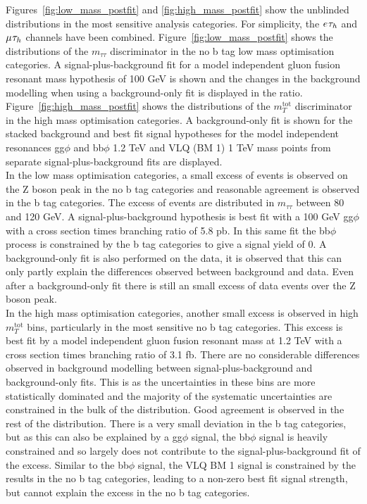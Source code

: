 Figures~\ref{fig:low_mass_postfit} and \ref{fig:high_mass_postfit} show the unblinded distributions in the most sensitive analysis categories.
For simplicity, the $e_{}\tau_{h}$ and $\mu_{}\tau_{h}$ channels have been combined.
Figure~\ref{fig:low_mass_postfit} shows the distributions of the $m_{\tau\tau}$ discriminator in the no b tag low mass optimisation categories. 
A signal-plus-background fit for a model independent gluon fusion resonant mass hypothesis of 100 GeV is shown and the changes in the background modelling when using a background-only fit is displayed in the ratio.
Figure~\ref{fig:high_mass_postfit} shows the distributions of the $m_{T}^{\text{tot}}$ discriminator in the high mass optimisation categories.
A background-only fit is shown for the stacked background and best fit signal hypotheses for the model independent resonances gg$\phi$ and bb$\phi$ 1.2 TeV and VLQ (BM 1) 1 TeV mass points from separate signal-plus-background fits are displayed. \\

In the low mass optimisation categories, a small excess of events is observed on the Z boson peak in the no b tag categories and reasonable agreement is observed in the b tag categories.
The excess of events are distributed in $m_{\tau\tau}$ between 80 and 120 GeV.
A signal-plus-background hypothesis is best fit with a 100 GeV gg$\phi$ with a cross section times branching ratio of 5.8 pb. 
In this same fit the bb$\phi$ process is constrained by the b tag categories to give a signal yield of 0.
A background-only fit is also performed on the data, it is observed that this can only partly explain the differences observed between background and data.
Even after a background-only fit there is still an small excess of data events over the Z boson peak. \\

In the high mass optimisation categories, another small excess is observed in high $m_{T}^{\text{tot}}$ bins, particularly in the most sensitive no b tag categories.
This excess is best fit by a model independent gluon fusion resonant mass at 1.2 TeV with a cross section times branching ratio of 3.1 fb.
There are no considerable differences observed in background modelling between signal-plus-background and background-only fits.
This is as the uncertainties in these bins are more statistically dominated and the majority of the systematic uncertainties are constrained in the bulk of the distribution.
Good agreement is observed in the rest of the distribution.
There is a very small deviation in the b tag categories, but as this can also be explained by a gg$\phi$ signal, the bb$\phi$ signal is heavily constrained and so largely does not contribute to the signal-plus-background fit of the excess.
Similar to the bb$\phi$ signal, the VLQ BM 1 signal is constrained by the results in the no b tag categories, leading to a non-zero best fit signal strength, but cannot explain the excess in the no b tag categories. \\

